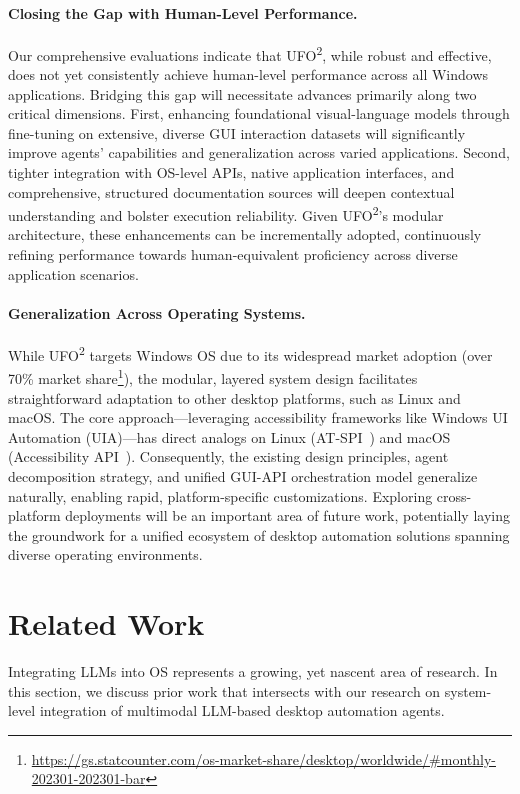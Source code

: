 \documentclass[sigplan,10pt]{acmart}
\newcommand{\name}{\textsc{UFO}\textsuperscript{2}\xspace}
\begin{document}
\paragraph{Closing the Gap with Human-Level Performance.}
Our comprehensive evaluations indicate that \name, while robust and effective, does not yet consistently achieve human-level performance across all Windows applications. Bridging this gap will necessitate advances primarily along two critical dimensions. First, enhancing foundational visual-language models through fine-tuning on extensive, diverse GUI interaction datasets will significantly improve agents' capabilities and generalization across varied applications. Second, tighter integration with OS-level APIs, native application interfaces, and comprehensive, structured documentation sources will deepen contextual understanding and bolster execution reliability. Given \name's modular architecture, these enhancements can be incrementally adopted, continuously refining performance towards human-equivalent proficiency across diverse application scenarios.

\paragraph{Generalization Across Operating Systems.}
While \name targets Windows OS due to its widespread market adoption (over 70\% market share\footnote{\url{https://gs.statcounter.com/os-market-share/desktop/worldwide/\#monthly-202301-202301-bar}}), the modular, layered system design facilitates straightforward adaptation to other desktop platforms, such as Linux and macOS. The core approach—leveraging accessibility frameworks like Windows UI Automation (UIA)—has direct analogs on Linux (AT-SPI~\cite{atspi}) and macOS (Accessibility API~\cite{apple_accessibility_api}). Consequently, the existing design principles, agent decomposition strategy, and unified GUI-API orchestration model generalize naturally, enabling rapid, platform-specific customizations. Exploring cross-platform deployments will be an important area of future work, potentially laying the groundwork for a unified ecosystem of desktop automation solutions spanning diverse operating environments.




\section{Related Work}

Integrating LLMs into OS represents a growing, yet nascent area of research. In this section, we discuss prior work that intersects with our research on system-level integration of multimodal LLM-based desktop automation agents.
\end{document}
